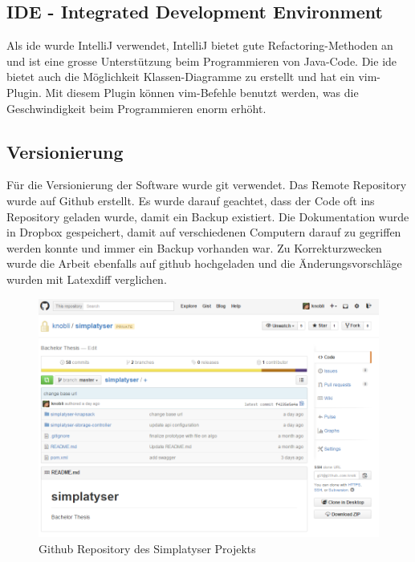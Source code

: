 \subsection{IDE - Integrated Development Environment}
Als \gls{ide} wurde IntelliJ verwendet, IntelliJ bietet gute Refactoring-Methoden an und ist eine grosse Unterstützung beim Programmieren von Java-Code. Die \gls{ide} 
bietet auch die Möglichkeit Klassen-Diagramme zu erstellt und hat ein \gls{vim}-Plugin. Mit diesem Plugin können \gls{vim}-Befehle benutzt werden, was die 
Geschwindigkeit beim Programmieren enorm erhöht.


\subsection{Versionierung}
Für die Versionierung der Software wurde git \cite{git} verwendet. Das Remote Repository wurde auf Github \cite{github_simplatyzer} erstellt. Es wurde darauf geachtet, dass 
der Code oft ins Repository geladen wurde, damit ein Backup existiert. Die Dokumentation wurde in Dropbox gespeichert, damit auf verschiedenen Computern darauf zu gegriffen werden konnte 
und immer ein Backup vorhanden war. Zu Korrekturzwecken wurde die Arbeit ebenfalls auf github hochgeladen und die Änderungsvorschläge wurden mit Latexdiff verglichen.

\begin{figure}[h]
\centering
\includegraphics[scale=0.5]{images/github.png}
\caption[Github Repository des Simplatyser Projekts]{Github Repository des Simplatyser Projekts \selfmade{}}
\label{fig:github_repo}
\end{figure}

